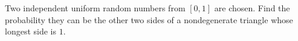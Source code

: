 Two independent uniform random numbers from $[0,1]$ are chosen. Find the probability they can be the other two sides of a nondegenerate triangle whose longest side is $1$.
